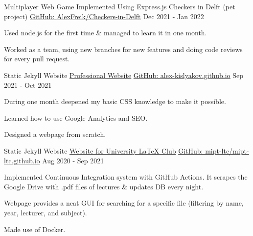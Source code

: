 
\newcommand{\gitHref}[1]{\href{https://github.com/#1}{GitHub: \underline{#1}}}
\newcommand{\myHref}[2]{\href{#1}{\underline{#2}}}

\begin{cventries}

  \cventry
    {Multiplayer Web Game Implemented Using Express.js}
    {Checkers in Delft (pet project)} 
    {\gitHref{AlexFreik/Checkers-in-Delft}} %
    {Dec 2021 - Jan 2022} %
    {
      \begin{cvitems} %
        \item {Used node.js for the first time \&
            managed to learn it in one month.}
        \item {Worked as a team, using new branches for new features and doing
            code reviews for every pull request.}
      \end{cvitems}
    }

  \cventry
    {Static Jekyll Website}
    {\href{https://aleksnlp.com/}{\underline{Professional Website}}} 
    {\gitHref{alex-kislyakov.github.io}} %
    {Sep 2021 - Oct 2021} %
    {
      \begin{cvitems} %
        \item {During one month deepened my basic CSS knowledge 
            to make it possible.}
        \item {Learned how to use Google Analytics and SEO.}
        \item {Designed a webpage from scratch.}
      \end{cvitems}
    }
  \cventry
    {Static Jekyll Website}
    {\href{https://mipt-ltc.github.io/}{\underline{Website for University LaTeX Club}}} 
    {\gitHref{mipt-ltc/mipt-ltc.github.io}} %
    {Aug 2020 - Sep 2021} %
    {
      \begin{cvitems} %
      \item {Implemented Continuous Integration system with GitHub Actions. It scrapes the Google Drive with .pdf files of lectures \& updates DB every night.}
        \item {Webpage provides a neat GUI for searching for a 
            specific file (filtering by name, year, lecturer, and subject).}
        \item {Made use of Docker.}
      \end{cvitems}
    }


\end{cventries}
